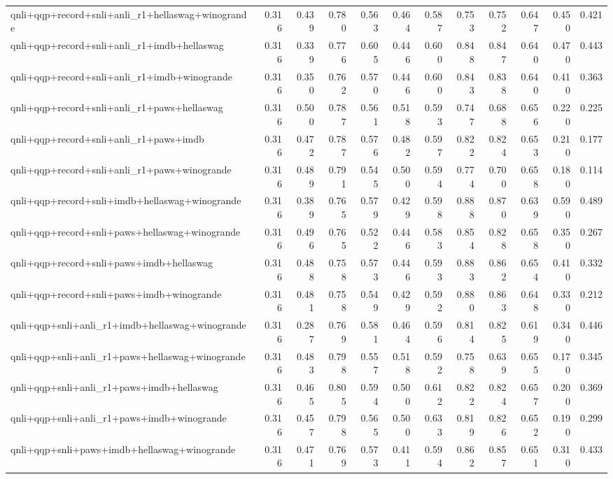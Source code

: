 \begin{table}[t]
\begin{tabular}{lrrrrrrrrrrr}
    qnli+qqp+record+snli+anli\_r1+hellaswag+winogrande & 0.316 & 0.439 & 0.780 & 0.563 & 0.464 & 0.587 & 0.753 & 0.752 & 0.647 & 0.450 & 0.421 \\
    qnli+qqp+record+snli+anli\_r1+imdb+hellaswag & 0.316 & 0.339 & 0.776 & 0.605 & 0.446 & 0.600 & 0.848 & 0.847 & 0.640 & 0.470 & 0.443 \\
    qnli+qqp+record+snli+anli\_r1+imdb+winogrande & 0.316 & 0.350 & 0.762 & 0.570 & 0.446 & 0.600 & 0.843 & 0.838 & 0.640 & 0.410 & 0.363 \\
    qnli+qqp+record+snli+anli\_r1+paws+hellaswag & 0.316 & 0.500 & 0.787 & 0.561 & 0.518 & 0.593 & 0.747 & 0.688 & 0.656 & 0.220 & 0.225 \\
    qnli+qqp+record+snli+anli\_r1+paws+imdb & 0.316 & 0.472 & 0.787 & 0.576 & 0.482 & 0.597 & 0.822 & 0.824 & 0.653 & 0.210 & 0.177 \\
    qnli+qqp+record+snli+anli\_r1+paws+winogrande & 0.316 & 0.489 & 0.791 & 0.545 & 0.500 & 0.594 & 0.774 & 0.700 & 0.658 & 0.180 & 0.114 \\
    qnli+qqp+record+snli+imdb+hellaswag+winogrande & 0.316 & 0.389 & 0.765 & 0.579 & 0.429 & 0.598 & 0.888 & 0.870 & 0.639 & 0.590 & 0.489 \\
    qnli+qqp+record+snli+paws+hellaswag+winogrande & 0.316 & 0.496 & 0.765 & 0.522 & 0.446 & 0.583 & 0.854 & 0.828 & 0.658 & 0.350 & 0.267 \\
    qnli+qqp+record+snli+paws+imdb+hellaswag & 0.316 & 0.488 & 0.758 & 0.573 & 0.446 & 0.593 & 0.883 & 0.862 & 0.654 & 0.410 & 0.332 \\
    qnli+qqp+record+snli+paws+imdb+winogrande & 0.316 & 0.481 & 0.758 & 0.549 & 0.429 & 0.592 & 0.880 & 0.863 & 0.648 & 0.330 & 0.212 \\
    qnli+qqp+snli+anli\_r1+imdb+hellaswag+winogrande & 0.316 & 0.287 & 0.769 & 0.581 & 0.464 & 0.596 & 0.814 & 0.825 & 0.619 & 0.340 & 0.446 \\
    qnli+qqp+snli+anli\_r1+paws+hellaswag+winogrande & 0.316 & 0.483 & 0.798 & 0.557 & 0.518 & 0.592 & 0.758 & 0.639 & 0.655 & 0.170 & 0.345 \\
    qnli+qqp+snli+anli\_r1+paws+imdb+hellaswag & 0.316 & 0.465 & 0.805 & 0.594 & 0.500 & 0.612 & 0.822 & 0.824 & 0.657 & 0.200 & 0.369 \\
    qnli+qqp+snli+anli\_r1+paws+imdb+winogrande & 0.316 & 0.457 & 0.798 & 0.565 & 0.500 & 0.633 & 0.819 & 0.826 & 0.652 & 0.190 & 0.299 \\
    qnli+qqp+snli+paws+imdb+hellaswag+winogrande & 0.316 & 0.471 & 0.769 & 0.573 & 0.411 & 0.594 & 0.862 & 0.857 & 0.651 & 0.310 & 0.433 \\

\end{tabular}
\end{table}
